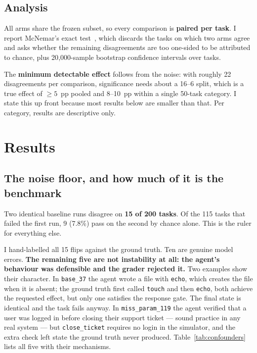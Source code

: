 \documentclass[a4paper, 12pt]{article}
\begin{document}
\subsection{Analysis}

All arms share the frozen subset, so every comparison is \textbf{paired per
task}. I report McNemar's exact test~\cite{mcnemar1947}, which discards the
tasks on which two arms agree and asks whether the remaining disagreements are
too one-sided to be attributed to chance, plus 20{,}000-sample bootstrap
confidence intervals over tasks.

The \textbf{minimum detectable effect} follows from the noise: with roughly 22
disagreements per comparison, significance needs about a 16--6 split, which is a
true effect of $\ge 5$~pp pooled and 8--10~pp within a single 50-task category.
I state this up front because most results below are smaller than that. Per
category, results are descriptive only.

\section{Results}

\subsection{The noise floor, and how much of it is the benchmark}
\label{sec:noise}

Two identical baseline runs disagree on \textbf{15 of 200 tasks}. Of the 115
tasks that failed the first run, 9 (7.8\%) pass on the second by chance alone.
This is the ruler for everything else.

I hand-labelled all 15 flips against the ground truth. Ten are genuine model
errors. \textbf{The remaining five are not instability at all: the agent's
behaviour was defensible and the grader rejected it.} Two examples show their
character. In \texttt{base\_37} the agent wrote a file with \texttt{echo},
which creates the file when it is absent; the ground truth first called
\texttt{touch} and then \texttt{echo}, both achieve the requested effect, but only
one satisfies the response gate. The final state is identical and the task fails anyway.
In \texttt{miss\_param\_119} the agent
verified that a user was logged in before closing their support ticket --- sound
practice in any real system --- but \texttt{close\_ticket} requires no login in
the simulator, and the extra check left state the ground truth never produced.
Table~\ref{tab:confounders} lists all five with their mechanisms.
\end{document}
